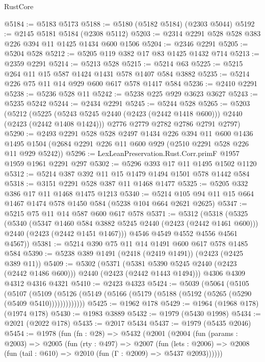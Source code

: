 \begin{lexlean}{RustCore}
\begin{coremodule}
@5184 := @5183 @5173
@5188 := @5180 (@5182 @5184) (@2303 @5044)
@5192 := @2145 @5181 @5184 (@2308 @5112)
@5203 := @2314 @2291 @528 @528 @383 @226 @394 @11 @1425 @1434 @600 @1506
@5204 := @2346 @2291
@5205 := @5204 @528
@5212 := @5205 @119 @382 @17 @83 @1425 @1432 @714
@5213 := @2359 @2291
@5214 := @5213 @528
@5215 := @5214 @63
@5225 := @5215 @264 @11 @15 @587 @1424 @1431 @578 @1407 @584 @3882
@5235 := @5214 @226 @75 @11 @14 @929 @600 @617 @578 @1417 @584
@5236 := @2410 @2291
@5238 := @5236 @528 @11
@5242 := @5238 @225 @929 @3623 @3627
@5243 := @5235 @5242
@5244 := @2434 @2291
@5245 := @5244 @528
@5265 := @5203
    (@5212
      (@5225 (@5243 @5245 @2440 (@2423 (@2442 @1418 @600))) @2440 (@2423 (@2442 @1408 @1424)))
      @2776
      @2779
      @2782
      @2786
      @2791
      @2797)
@5290 := @2493
    @2291
    @528
    @528
    @2497
    @1434
    @226
    @394
    @11
    @600
    @1436
    @1495
    @1504
    (@2684 @2291 @226 @11 @600 @929 (@2510 @2291 @528 @226 @11 @929 @5242))
@5296 := LexLeanPreservation.Rust.Corr.primF @1957 @1959 @1961 @2291 @297
@5302 := @5296 @393 @17 @11 @1495 @1502 @1120
@5312 := @5214 @387 @392 @11 @15 @1479 @1494 @1501 @578 @1442 @584
@5318 := @3151 @2291 @528 @387 @11 @1468 @1477
@5325 := @5205 @332 @386 @17 @11 @1468 @1475 @1213
@5340 := @5214 @105 @94 @11 @15 @664 @1467 @1474 @578 @1450 @584 (@5238 @104 @664 @2621 @2625)
@5347 := @5215 @75 @11 @14 @587 @600 @617 @578
@5371 := @5312
    (@5318
      (@5325
        (@5340
          (@5347 @1460 @584 @3882 @5245 @2440 (@2423 (@2442 @1461 @600)))
          @2440
          (@2423 (@2442 @1451 @1467)))
        @4546
        @4549
        @4552
        @4556
        @4561
        @4567))
@5381 := @5214 @390 @75 @11 @14 @1491 @600 @617 @578 @1485 @584
@5390 := @5238 @389 @1491 (@2418 (@2419 @1491)) (@2423 (@2425 @389 @11))
@5409 := @5302
    (@5371 (@5381 @5390 @5245 @2440 (@2423 (@2442 @1486 @600))) @2440 (@2423 (@2442 @1443 @1494)))
    @4306
    @4309
    @4312
    @4316
    @4321
@5410 := @2423 @4323
@5424 := @5039
    (@5064
      (@5105
        (@5107
          (@5109 (@5126 (@5149 (@5166 (@5179 (@5188 (@5192 (@5265 (@5290 (@5409 @5410)))))))))))))
@5425 := @1962 @178
@5429 := @1964 (@1968 @178) (@1974 @178)
@5430 := @1983 @3889
@5432 := @1979 (@5430 @1998)
@5434 := @2021 (@2022 @178)
@5435 := @2017 @5434
@5437 := @1979 (@5435 @2046)
@5454 := @1978
    (fun (fn : @28) =>
    @5432
      (@2001
        (@2004
          (fun (params : @2003) =>
          @2005
            (fun (rty : @497) =>
            @2007
              (fun (lets : @2006) =>
              @2008 (fun (tail : @610) => @2010 (fun (Γ : @2009) => @5437 @2093))))))

\end{coremodule}
\end{lexlean}
